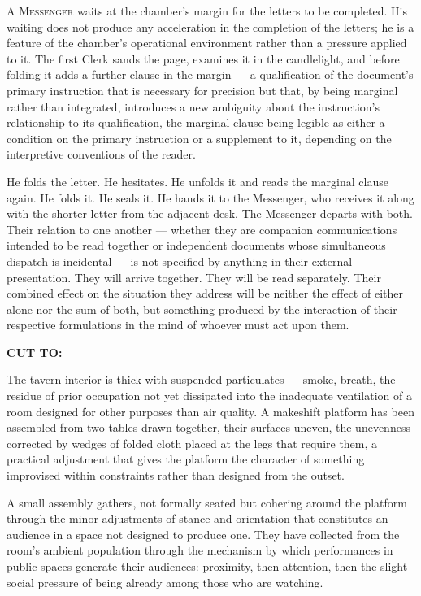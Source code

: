 \documentclass[12pt, oneside]{article}
\newcommand{\sceneheading}[1]{%
  \vspace{1.8em}%
  \noindent{\bfseries\large\MakeUppercase{#1}}%
  \vspace{0.6em}%
  \par\noindent{\color{rulecolor}\rule{\linewidth}{0.3pt}}%
  \vspace{0.5em}\par%
}
\newenvironment{action}{%
  \vspace{0.6em}%
  \noindent\ignorespaces%
}{%
  \par\vspace{0.6em}%
}
\newcommand{\scenenumber}[1]{%
  \vspace{1em}%
  \noindent{\small\bfseries\scshape Scene #1}%
  \vspace{0.3em}\par%
}
\newcommand{\transition}[1]{%
  \vspace{0.8em}%
  \begin{flushright}%
    \bfseries #1%
  \end{flushright}%
  \vspace{0.5em}%
}
\begin{document}
\begin{action}
A \textsc{Messenger} waits at the chamber's margin for the letters to be completed. His waiting does not produce any acceleration in the completion of the letters; he is a feature of the chamber's operational environment rather than a pressure applied to it. The first Clerk sands the page, examines it in the candlelight, and before folding it adds a further clause in the margin --- a qualification of the document's primary instruction that is necessary for precision but that, by being marginal rather than integrated, introduces a new ambiguity about the instruction's relationship to its qualification, the marginal clause being legible as either a condition on the primary instruction or a supplement to it, depending on the interpretive conventions of the reader.

He folds the letter. He hesitates. He unfolds it and reads the marginal clause again. He folds it. He seals it. He hands it to the Messenger, who receives it along with the shorter letter from the adjacent desk. The Messenger departs with both. Their relation to one another --- whether they are companion communications intended to be read together or independent documents whose simultaneous dispatch is incidental --- is not specified by anything in their external presentation. They will arrive together. They will be read separately. Their combined effect on the situation they address will be neither the effect of either alone nor the sum of both, but something produced by the interaction of their respective formulations in the mind of whoever must act upon them.
\end{action}

\transition{CUT TO:}

\scenenumber{15c — Tavern: Goliath Rotating Roles}

\sceneheading{INT. Tavern — Night}

\begin{action}
The tavern interior is thick with suspended particulates --- smoke, breath, the residue of prior occupation not yet dissipated into the inadequate ventilation of a room designed for other purposes than air quality. A makeshift platform has been assembled from two tables drawn together, their surfaces uneven, the unevenness corrected by wedges of folded cloth placed at the legs that require them, a practical adjustment that gives the platform the character of something improvised within constraints rather than designed from the outset.

A small assembly gathers, not formally seated but cohering around the platform through the minor adjustments of stance and orientation that constitutes an audience in a space not designed to produce one. They have collected from the room's ambient population through the mechanism by which performances in public spaces generate their audiences: proximity, then attention, then the slight social pressure of being already among those who are watching.
\end{action}
\end{document}
